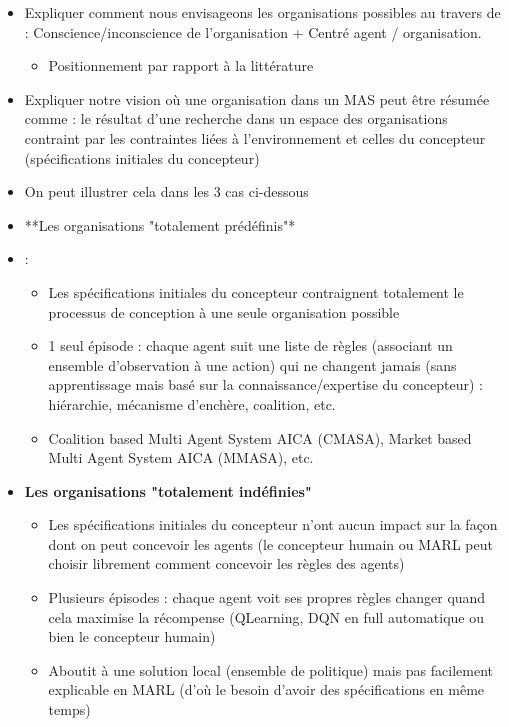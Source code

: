 \documentclass{article}
\begin{document}
\begin{itemize}

    \item Expliquer comment nous envisageons les organisations possibles au travers de : Conscience/inconscience de l’organisation + Centré agent / organisation.
          \begin{itemize}
              \item Positionnement par rapport à la littérature
          \end{itemize}
    \item Expliquer notre vision où une organisation dans un MAS peut être résumée comme : le résultat d'une recherche dans un espace des organisations contraint par les contraintes liées à l'environnement et celles du concepteur (spécifications initiales du concepteur)
    \item On peut illustrer cela dans les 3 cas ci-dessous
    \item **Les organisations "totalement prédéfinis"*\item :
          \begin{itemize}
              \item Les spécifications initiales du concepteur contraignent totalement le processus de conception à une seule organisation possible
              \item 1 seul épisode : chaque agent suit une liste de règles (associant un ensemble d’observation à une action) qui ne changent jamais (sans apprentissage mais basé sur la connaissance/expertise du concepteur) : hiérarchie, mécanisme d’enchère, coalition, etc.
              \item Coalition based Multi Agent System AICA (CMASA), Market based Multi Agent System AICA (MMASA), etc.
          \end{itemize}
    \item \textbf{Les organisations "totalement indéfinies"}
          \begin{itemize}
              \item Les spécifications initiales du concepteur n'ont aucun impact sur la façon dont on peut concevoir les agents (le concepteur humain ou MARL peut choisir librement comment concevoir les règles des agents)
              \item Plusieurs épisodes : chaque agent voit ses propres règles changer quand cela maximise la récompense (QLearning, DQN en full automatique ou bien le concepteur humain)
              \item Aboutit à une solution local (ensemble de politique) mais pas facilement explicable en MARL (d'où le besoin d'avoir des spécifications en même temps)

\end{itemize}
\end{itemize}
\end{document}
